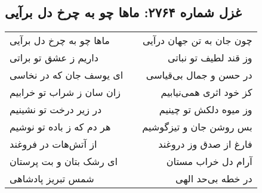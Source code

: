 \begin{center}
\section*{غزل شماره ۲۷۶۴: ماها چو به چرخ دل برآیی}
\label{sec:2764}
\begin{longtable}{l p{0.5cm} r}
ماها چو به چرخ دل برآیی
&&
چون جان به تن جهان درآیی
\\
داریم ز عشق تو براتی
&&
وز قند لطیف تو نباتی
\\
ای یوسف جان که در نخاسی
&&
در حسن و جمال بی‌قیاسی
\\
زان سان ز شراب تو خرابیم
&&
کز خود اثری همی‌نیابیم
\\
در زیر درخت تو نشینیم
&&
وز میوه دلکش تو چینیم
\\
هر دم که ز باده تو نوشیم
&&
بس روشن جان و تیزگوشیم
\\
از آتش‌هات در فروغند
&&
فارغ از صدق وز دروغند
\\
ای رشک بتان و بت پرستان
&&
آرام دل خراب مستان
\\
شمس تبریز پادشاهی
&&
در خطه بی‌حد الهی
\\
\end{longtable}
\end{center}
